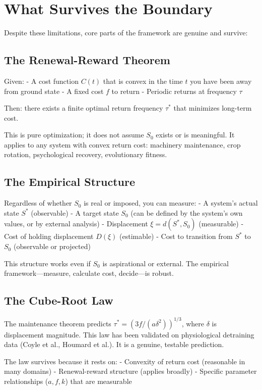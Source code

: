 \documentclass[12pt]{article}
\begin{document}
\section{What Survives the Boundary}

Despite these limitations, core parts of the framework are genuine and survive:

\subsection{The Renewal-Reward Theorem}

Given:
- A cost function $C(t)$ that is convex in the time $t$ you have been away from ground state
- A fixed cost $f$ to return
- Periodic returns at frequency $\tau$

Then: there exists a finite optimal return frequency $\tau^*$ that minimizes long-term cost.

This is pure optimization; it does not assume $S_0$ exists or is meaningful. It applies to any system with convex return cost: machinery maintenance, crop rotation, psychological recovery, evolutionary fitness.

\subsection{The Empirical Structure}

Regardless of whether $S_0$ is real or imposed, you can measure:
- A system's actual state $S^*$ (observable)
- A target state $S_0$ (can be defined by the system's own values, or by external analysis)
- Displacement $\xi = d(S^*, S_0)$ (measurable)
- Cost of holding displacement $D(\xi)$ (estimable)
- Cost to transition from $S^*$ to $S_0$ (observable or projected)

This structure works even if $S_0$ is aspirational or external. The empirical framework—measure, calculate cost, decide—is robust.

\subsection{The Cube-Root Law}

The maintenance theorem predicts $\tau^* = (3f / (a\delta^2))^{1/3}$, where $\delta$ is displacement magnitude. This law has been validated on physiological detraining data (Coyle et al., Houmard et al.). It is a genuine, testable prediction.

The law survives because it rests on:
- Convexity of return cost (reasonable in many domains)
- Renewal-reward structure (applies broadly)
- Specific parameter relationships ($a, f, k$) that are measurable
\end{document}
